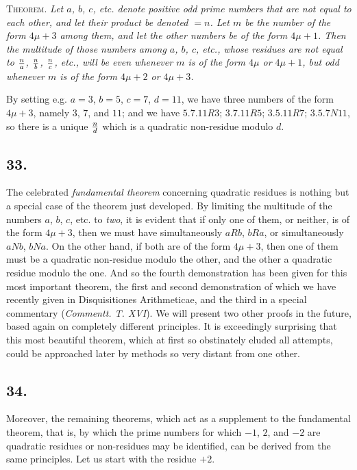\documentclass[twoside,12pt]{memoir}
\let\oldfrac\frac
\def\frac#1#2{\mathchoice{\tfrac{#1}{#2}}{\oldfrac{#1}{#2}}{\genfrac{}{}{}{2}{#1}{#2\mathstrut}}{\genfrac{}{}{}{3}{#1}{#2\mathstrut}}}
\begin{document}
\textsc{Theorem.} \textit{Let \(a\), \(b\), \(c\), etc{.} denote positive odd prime numbers that are not equal to each other, and let their product be denoted \(=n\). Let \(m\) be the number of the form \(4\mu + 3\) among them, and let the other numbers be of the form \(4\mu + 1\). Then the multitude of those numbers among \(a\), \(b\), \(c\), etc{.}, whose residues are not equal to \(\frac{n}{a}\), \(\frac{n}{b}\), \(\frac{n}{c}\), etc{.}, will be even whenever \(m\) is of the form \(4\mu\) or \(4\mu + 1\), but odd whenever \(m\) is of the form \(4\mu + 2\) or \(4\mu + 3\).}
 
By setting e{.}g{.} \(a=3\), \(b=5\), \(c=7\), \(d=11\), we have three numbers of the form \(4\mu + 3\), namely \(3
\), \(7\), and \(11\); and we have \(5 . 7 . 11 R 3\); \(3 . 7 . 11 R 5\); \(3 . 5 . 11 R 7\); \(3 . 5 . 7 N 11\), so there is a unique \(\frac{n}{d}\) which is a quadratic non-residue modulo \(d\).

\subsection*{33.}

The celebrated \textit{fundamental theorem} concerning quadratic residues is nothing but a special case of the theorem just developed. By limiting the multitude \pagebreak%
of the numbers \(a\), \(b\), \(c\), etc{.} to \textit{two}, it is evident that if only one of them, or neither, is of the form \(4 \mu+3\), then we must have simultaneously \(a R b\), \(b R a\), or simultaneously \(a N b\), \(b N a\).  On the other hand, if both are of the form \(4 \mu+3\), then one of them must be a quadratic non-residue modulo the other, and the other a quadratic residue modulo the one. And so the fourth demonstration has been given for this most important theorem, the first and second demonstration of which we have recently given in Disquisitiones Arithmeticae, and the third in a special commentary (\textit{Commentt. T. XVI}). We will present two other proofs in the future, based again on completely different principles.  It is exceedingly surprising that this most beautiful theorem, which at first so obstinately eluded all attempts, could be approached later by methods so very distant from one other.

\subsection*{34.}

Moreover, the remaining theorems, which act as a supplement to the fundamental theorem, that is, by which the prime numbers for which \(-1\), \(2\), and \(-2\) are quadratic residues or non-residues may be identified, can be derived from the same principles.  Let us start with the residue \(+2\).
\end{document}
